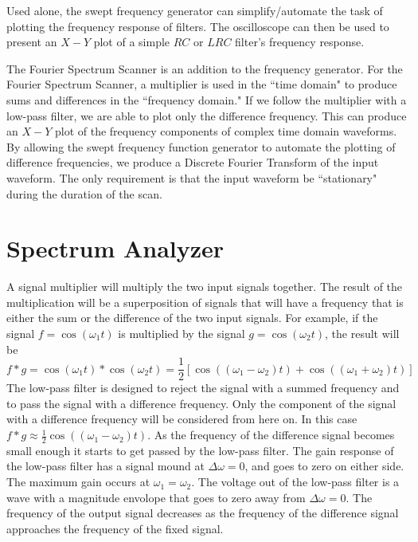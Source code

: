 Used alone, the swept frequency generator can simplify/automate the task of plotting the frequency response of filters. The oscilloscope can then be used to present an $X-Y$ plot of a simple $RC$ or $LRC$ filter's frequency response.

The Fourier Spectrum Scanner is an addition to the frequency generator. For the Fourier Spectrum Scanner, a multiplier is used in the ``time domain" to produce sums and differences in the ``frequency domain." If we follow the multiplier with a low-pass filter, we are able to plot only the difference frequency. This can produce an $X-Y$ plot of the frequency components of complex time domain waveforms. By allowing the swept frequency function generator to automate the plotting of difference frequencies, we produce a Discrete Fourier Transform of the input waveform. The only requirement is that the input waveform be ``stationary" during the duration of the scan.

\section{Spectrum Analyzer}

A signal multiplier will multiply the two input signals together. The result of the multiplication will be a superposition of signals that will have a frequency that is either the sum or the difference of the two input signals. For example, if the signal $f = \cos(\omega_1t)$ is multiplied by the signal $g = \cos(\omega_2t)$, the result will be \begin{equation*}
    f*g = \cos(\omega_1t)*\cos(\omega_2t) = \frac{1}{2}\left[\cos((\omega_1-\omega_2)t)+\cos((\omega_1+\omega_2)t)\right]
\end{equation*}
The low-pass filter is designed to reject the signal with a summed frequency and to pass the signal with a difference frequency. Only the component of the signal with a difference frequency will be considered from here on. In this case $f*g\approx \frac{1}{2}\cos((\omega_1-\omega_2)t)$. As the frequency of the difference signal becomes small enough it starts to get passed by the low-pass filter. The gain response of the low-pass filter has a signal mound at $\Delta\omega = 0$, and goes to zero on either side. The maximum gain occurs at $\omega_1 = \omega_2$. The voltage out of the low-pass filter is a wave with a magnitude envolope that goes to zero away from $\Delta\omega = 0$. The frequency of the output signal decreases as the frequency of the difference signal approaches the frequency of the fixed signal.

